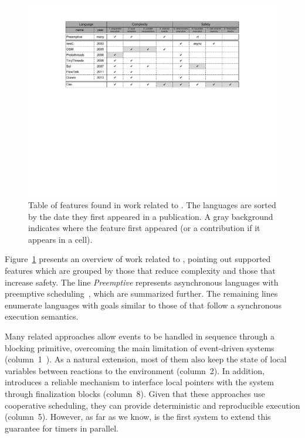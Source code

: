 
\begin{figure}[t]
\includegraphics[width=\textwidth,clip=true,trim=110px 340px 120px 0px]{related}
\caption{ Table of features found in work related to \CEU. \newline
{\small %
The languages are sorted by the date they first appeared in a publication.
A gray background indicates where the feature first appeared (or a contribution 
if it appears in a \CEU cell).
}%
\label{fig.related}
}
\end{figure}


Figure~\ref{fig.related} presents an overview of work related to \CEU, pointing 
out supported features which are grouped by those that reduce complexity and 
those that increase safety.
The line \emph{Preemptive} represents asynchronous languages with preemptive 
scheduling~\cite{wsn.mantisos,wsn.tosthreads}, which are summarized further.
The remaining lines enumerate languages with goals similar to those of \CEU 
that follow a synchronous execution semantics.

Many related approaches allow events to be handled in sequence through a 
blocking primitive, overcoming the main limitation of event-driven systems 
(column~1~\cite{wsn.protothreads, wsn.ocram, wsn.tinythreads, wsn.flowtalk, 
wsn.sol}).
%
As a natural extension, most of them also keep the state of local variables 
between reactions to the environment (column~2).
In addition, \CEU introduces a reliable mechanism to interface local pointers 
with the system through finalization blocks (column~8).
%
Given that these approaches use cooperative scheduling, they can provide 
deterministic and reproducible execution (column~5).
%
However, as far as we know, \CEU is the first system to extend this guarantee 
for timers in parallel.

